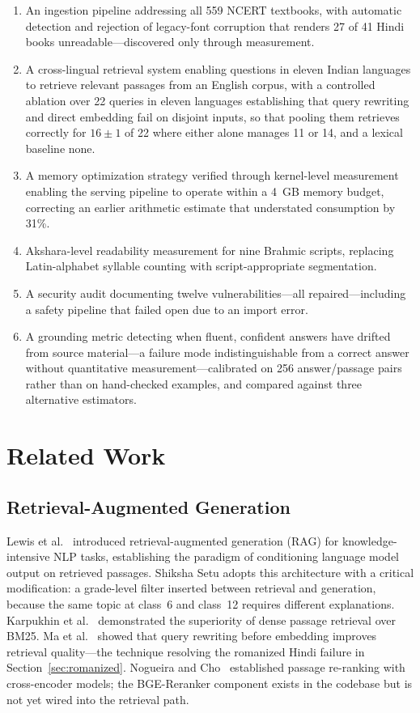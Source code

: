 \documentclass[conference]{IEEEtran}
\begin{document}
\begin{enumerate}
\item An ingestion pipeline addressing all 559 NCERT textbooks, with automatic detection and rejection of legacy-font corruption that renders 27 of 41 Hindi books unreadable---discovered only through measurement.
\item A cross-lingual retrieval system enabling questions in eleven Indian languages to retrieve relevant passages from an English corpus, with a controlled ablation over 22 queries in eleven languages establishing that query rewriting and direct embedding fail on disjoint inputs, so that pooling them retrieves correctly for $16\pm1$ of 22 where either alone manages 11 or 14, and a lexical baseline none.
\item A memory optimization strategy verified through kernel-level measurement enabling the serving pipeline to operate within a 4~GB memory budget, correcting an earlier arithmetic estimate that understated consumption by 31\%.
\item Akshara-level readability measurement for nine Brahmic scripts, replacing Latin-alphabet syllable counting with script-appropriate segmentation.
\item A security audit documenting twelve vulnerabilities---all repaired---including a safety pipeline that failed open due to an import error.
\item A grounding metric detecting when fluent, confident answers have drifted from source material---a failure mode indistinguishable from a correct answer without quantitative measurement---calibrated on 256 answer/passage pairs rather than on hand-checked examples, and compared against three alternative estimators.
\end{enumerate}

\section{Related Work}

\subsection{Retrieval-Augmented Generation}
Lewis et al.~\cite{b2} introduced retrieval-augmented generation (RAG) for knowledge-intensive NLP tasks, establishing the paradigm of conditioning language model output on retrieved passages. Shiksha Setu adopts this architecture with a critical modification: a grade-level filter inserted between retrieval and generation, because the same topic at class~6 and class~12 requires different explanations. Karpukhin et al.~\cite{b3} demonstrated the superiority of dense passage retrieval over BM25. Ma et al.~\cite{b4} showed that query rewriting before embedding improves retrieval quality---the technique resolving the romanized Hindi failure in Section~\ref{sec:romanized}. Nogueira and Cho~\cite{b5} established passage re-ranking with cross-encoder models; the BGE-Reranker component exists in the codebase but is not yet wired into the retrieval path.
\end{document}
